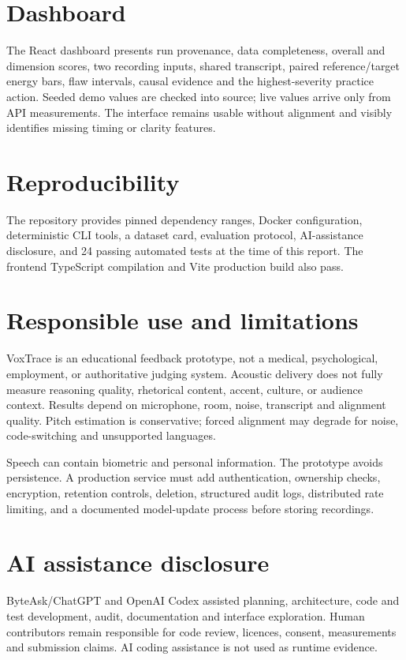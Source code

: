 \documentclass[10pt]{article}
\begin{document}
\section{Dashboard}
The React dashboard presents run provenance, data completeness, overall and dimension scores, two recording inputs, shared transcript, paired reference/target energy bars, flaw intervals, causal evidence and the highest-severity practice action. Seeded demo values are checked into source; live values arrive only from API measurements. The interface remains usable without alignment and visibly identifies missing timing or clarity features.

\section{Reproducibility}
The repository provides pinned dependency ranges, Docker configuration, deterministic CLI tools, a dataset card, evaluation protocol, AI-assistance disclosure, and 24 passing automated tests at the time of this report. The frontend TypeScript compilation and Vite production build also pass.

\newpage
\section{Responsible use and limitations}
VoxTrace is an educational feedback prototype, not a medical, psychological, employment, or authoritative judging system. Acoustic delivery does not fully measure reasoning quality, rhetorical content, accent, culture, or audience context. Results depend on microphone, room, noise, transcript and alignment quality. Pitch estimation is conservative; forced alignment may degrade for noise, code-switching and unsupported languages.

Speech can contain biometric and personal information. The prototype avoids persistence. A production service must add authentication, ownership checks, encryption, retention controls, deletion, structured audit logs, distributed rate limiting, and a documented model-update process before storing recordings.

\section{AI assistance disclosure}
ByteAsk/ChatGPT and OpenAI Codex assisted planning, architecture, code and test development, audit, documentation and interface exploration. Human contributors remain responsible for code review, licences, consent, measurements and submission claims. AI coding assistance is not used as runtime evidence.
\end{document}
